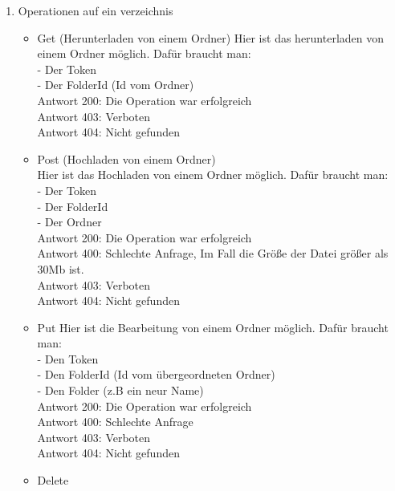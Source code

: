 \begin{enumerate}
\item Operationen auf ein verzeichnis
	\begin{itemize}
	\item Get (Herunterladen von einem Ordner)
Hier ist das herunterladen von einem Ordner m\"oglich. Daf\"ur braucht man: \\
	- Der Token \\
	- Der FolderId (Id vom  Ordner) \\
Antwort 200: Die Operation war erfolgreich \\ 
Antwort 403: Verboten \\
Antwort 404: Nicht gefunden
	\item Post (Hochladen von einem Ordner) \\
Hier ist das Hochladen von einem Ordner m\"oglich. Daf\"ur braucht man: \\
	- Der Token \\
	- Der FolderId \\
	- Der Ordner\\
Antwort 200: Die Operation war erfolgreich \\ 
Antwort 400: Schlechte Anfrage, Im Fall die Gr\"o{\ss}e der Datei gr\"o{\ss}er als 30Mb ist. \\
Antwort 403: Verboten \\
Antwort 404: Nicht gefunden
	\item Put
Hier ist die Bearbeitung von einem Ordner m\"oglich. Daf\"ur braucht man: \\
	- Den Token \\
	- Den FolderId (Id vom \"ubergeordneten Ordner) \\
	- Den Folder (z.B ein neur Name) \\
Antwort 200: Die Operation war erfolgreich \\ 
Antwort 400: Schlechte Anfrage \\
Antwort 403: Verboten \\
Antwort 404: Nicht gefunden
	\item Delete
	\end{itemize}
\end{enumerate}